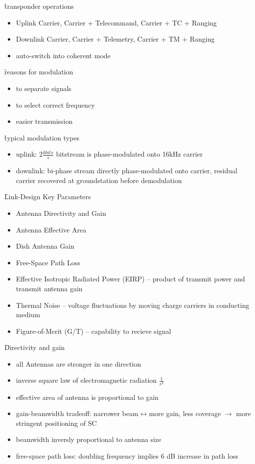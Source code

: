 \f{transponder operations}
\begin{itemize}
 \item Uplink Carrier, Carrier + Telecommand, Carrier + TC + Ranging
 \item Downlink Carrier, Carrier + Telemetry, Carrier + TM + Ranging
 \item auto-switch into coherent mode
\end{itemize}

\f{reasons for modulation}
\begin{itemize}
 \item to separate signals
 \item to select correct frequency
 \item easier transmission
\end{itemize}

\f{typical modulation types}
\begin{itemize}
 \item uplink: $2 \frac{kbits}{s}$ bitstream is phase-modulated onto 16kHz carrier
 \item downlink: bi-phase stream directly phase-modulated onto carrier, residual carrier recovered at groundstation before demodulation
\end{itemize}

\f{Link-Design Key Parameters}
\begin{itemize}
 \item Antenna Directivity and Gain
 \item Antenna Effective Area
 \item Dish Antenna Gain
 \item Free-Space Path Loss
 \item Effective Isotropic Radiated Power (EIRP) -- product of transmit power and transmit antenna gain
 \item Thermal Noise -- voltage fluctuations by moving charge carriers in conducting medium
 \item Figure-of-Merit (G/T) -- capability to recieve signal
\end{itemize}

\f{Directivity and gain}
\begin{itemize}
 \item all Antennas are stronger in one direction
 \item inverse square law of electromagnetic radiation $\frac{1}{r^2}$
 \item effective area of antenna is proportional to gain
 \item gain-beamwidth tradeoff: narrower beam$\leftrightarrow$more gain, less coverage $\rightarrow$ more stringent positioning of SC
 \item beamwidth inversly proportional to antenna size
 \item free-space path loss: doubling frequency implies 6 dB increase in path loss
\end{itemize}

